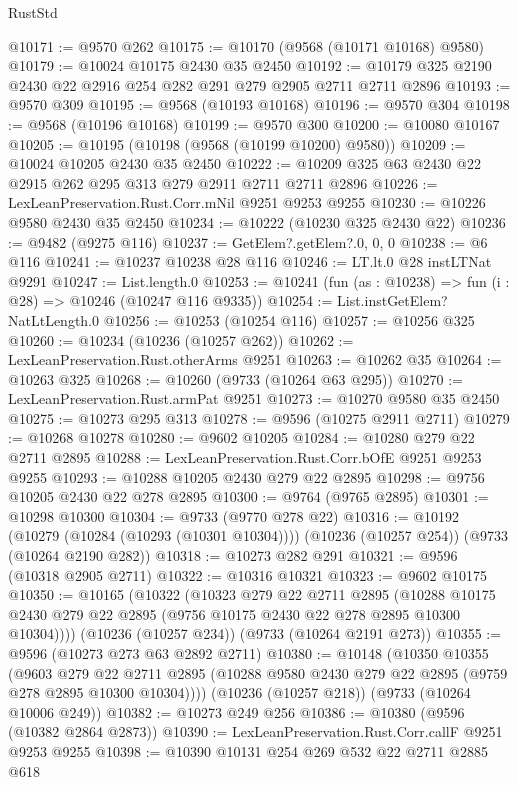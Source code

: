 \begin{lexlean}{RustStd}
\begin{coremodule}
{\begin{coremodule}
{{{{{{{{{{{{{{{{{{{{{{{{{{{{{{{{{{{{{{{{{{{{{{{{{{{{{{{@10171 := @9570 @262
@10175 := @10170 (@9568 (@10171 @10168) @9580)
@10179 := @10024 @10175 @2430 @35 @2450
@10192 := @10179 @325 @2190 @2430 @22 @2916 @254 @282 @291 @279 @2905 @2711 @2711 @2896
@10193 := @9570 @309
@10195 := @9568 (@10193 @10168)
@10196 := @9570 @304
@10198 := @9568 (@10196 @10168)
@10199 := @9570 @300
@10200 := @10080 @10167
@10205 := @10195 (@10198 (@9568 (@10199 @10200) @9580))
@10209 := @10024 @10205 @2430 @35 @2450
@10222 := @10209 @325 @63 @2430 @22 @2915 @262 @295 @313 @279 @2911 @2711 @2711 @2896
@10226 := LexLeanPreservation.Rust.Corr.mNil @9251 @9253 @9255
@10230 := @10226 @9580 @2430 @35 @2450
@10234 := @10222 (@10230 @325 @2430 @22)
@10236 := @9482 (@9275 @116)
@10237 := GetElem?.getElem?.{0, 0, 0}
@10238 := @6 @116
@10241 := @10237 @10238 @28 @116
@10246 := LT.lt.{0} @28 instLTNat @9291
@10247 := List.length.{0}
@10253 := @10241 (fun (as : @10238) => fun (i : @28) => @10246 (@10247 @116 @9335))
@10254 := List.instGetElem?NatLtLength.{0}
@10256 := @10253 (@10254 @116)
@10257 := @10256 @325
@10260 := @10234 (@10236 (@10257 @262))
@10262 := LexLeanPreservation.Rust.otherArms @9251
@10263 := @10262 @35
@10264 := @10263 @325
@10268 := @10260 (@9733 (@10264 @63 @295))
@10270 := LexLeanPreservation.Rust.armPat @9251
@10273 := @10270 @9580 @35 @2450
@10275 := @10273 @295 @313
@10278 := @9596 (@10275 @2911 @2711)
@10279 := @10268 @10278
@10280 := @9602 @10205
@10284 := @10280 @279 @22 @2711 @2895
@10288 := LexLeanPreservation.Rust.Corr.bOfE @9251 @9253 @9255
@10293 := @10288 @10205 @2430 @279 @22 @2895
@10298 := @9756 @10205 @2430 @22 @278 @2895
@10300 := @9764 (@9765 @2895)
@10301 := @10298 @10300
@10304 := @9733 (@9770 @278 @22)
@10316 := @10192
    (@10279 (@10284 (@10293 (@10301 @10304))))
    (@10236 (@10257 @254))
    (@9733 (@10264 @2190 @282))
@10318 := @10273 @282 @291
@10321 := @9596 (@10318 @2905 @2711)
@10322 := @10316 @10321
@10323 := @9602 @10175
@10350 := @10165
    (@10322
      (@10323
        @279
        @22
        @2711
        @2895
        (@10288 @10175 @2430 @279 @22 @2895 (@9756 @10175 @2430 @22 @278 @2895 @10300 @10304))))
    (@10236 (@10257 @234))
    (@9733 (@10264 @2191 @273))
@10355 := @9596 (@10273 @273 @63 @2892 @2711)
@10380 := @10148
    (@10350
      @10355
      (@9603
        @279
        @22
        @2711
        @2895
        (@10288 @9580 @2430 @279 @22 @2895 (@9759 @278 @2895 @10300 @10304))))
    (@10236 (@10257 @218))
    (@9733 (@10264 @10006 @249))
@10382 := @10273 @249 @256
@10386 := @10380 (@9596 (@10382 @2864 @2873))
@10390 := LexLeanPreservation.Rust.Corr.callF @9251 @9253 @9255
@10398 := @10390 @10131 @254 @269 @532 @22 @2711 @2885 @618
}}}}}}}}}}}}}}}}}}}}}}}}}}}}}}}}}}}}}}}}}}}}}}}}}}}}}}}
\end{coremodule}}
\end{coremodule}
\end{lexlean}

